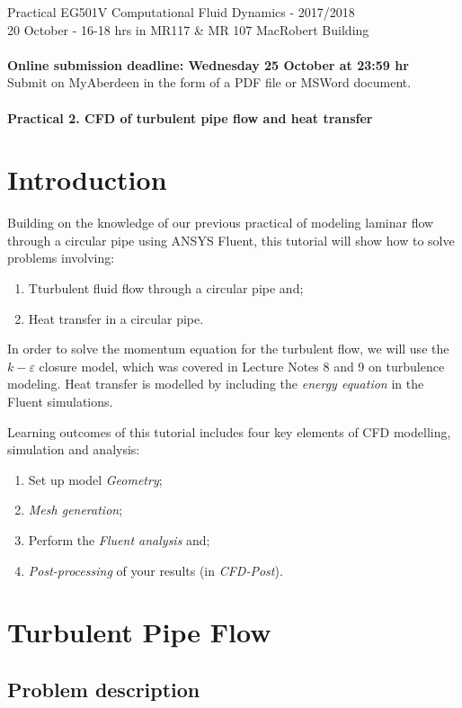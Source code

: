 \documentclass[11pt,a4paper,oneside]{scrartcl}
\begin{document}
Practical EG501V Computational Fluid Dynamics - 2017/2018\\
20 October - 16-18 hrs in MR117 \& MR 107 MacRobert Building
\\
\\
\textbf{Online submission deadline: Wednesday 25 October at 23:59 hr}\\
Submit on MyAberdeen in the form of a PDF file or MSWord document.\\
\\
\textbf{\Large{Practical 2. CFD of turbulent pipe flow and heat transfer}}

\section{Introduction}
Building on the knowledge of our previous practical of modeling laminar flow through a circular pipe using ANSYS Fluent, this tutorial will show how to solve problems involving:
\begin{enumerate}
   \item Tturbulent fluid flow through a circular pipe and;
   \item Heat transfer in a circular pipe.
\end{enumerate}
In order to solve the momentum equation for the turbulent flow, we will use the $k-\varepsilon$ closure model, which was covered in Lecture Notes 8 and 9 on turbulence modeling. Heat transfer is modelled by including the {\it energy equation} in the Fluent simulations.

Learning outcomes of this tutorial includes four key elements of CFD modelling, simulation and analysis:
  \begin{enumerate}
     \item Set up model \emph{Geometry};
     \item \emph{Mesh generation};
     \item Perform the \emph{Fluent analysis} and;
     \item \emph{Post-processing} of your results (in \emph{CFD-Post}).
  \end{enumerate}

\section{Turbulent Pipe Flow}\label{Part1}

\subsection{Problem description}
\end{document}
